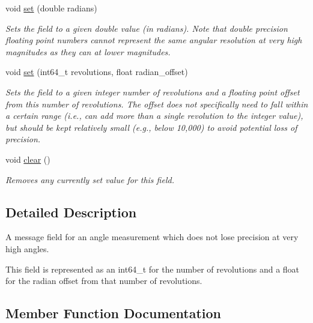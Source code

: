 \begin{DoxyCompactItemize}
void \hyperlink{classhebi_1_1Command_1_1HighResAngleField_aa166a76f8a6ea47b62dd53bee853fe90}{set} (double radians)
\begin{DoxyCompactList}\small\item\em Sets the field to a given double value (in radians). Note that double precision floating point numbers cannot represent the same angular resolution at very high magnitudes as they can at lower magnitudes. \end{DoxyCompactList}\item 
\mbox{\label{classhebi_1_1Command_1_1HighResAngleField_ad70b3a6cb991a2096466fb04d3973429}} 
void \hyperlink{classhebi_1_1Command_1_1HighResAngleField_ad70b3a6cb991a2096466fb04d3973429}{set} (int64\+\_\+t revolutions, float radian\+\_\+offset)
\begin{DoxyCompactList}\small\item\em Sets the field to a given integer number of revolutions and a floating point offset from this number of revolutions. The offset does not specifically need to fall within a certain range (i.\+e., can add more than a single revolution to the integer value), but should be kept relatively small (e.\+g., below 10,000) to avoid potential loss of precision. \end{DoxyCompactList}\item 
\mbox{\label{classhebi_1_1Command_1_1HighResAngleField_a2a7485482fbf0311d992c0db4036d5c1}} 
void \hyperlink{classhebi_1_1Command_1_1HighResAngleField_a2a7485482fbf0311d992c0db4036d5c1}{clear} ()
\begin{DoxyCompactList}\small\item\em Removes any currently set value for this field. \end{DoxyCompactList}\end{DoxyCompactItemize}


\subsection{Detailed Description}
A message field for an angle measurement which does not lose precision at very high angles. 

This field is represented as an int64\+\_\+t for the number of revolutions and a float for the radian offset from that number of revolutions. 

\subsection{Member Function Documentation}
\mbox{\label{classhebi_1_1Command_1_1HighResAngleField_ae05cea46d5ec4bbc632aea9b3a5c7598}} 
